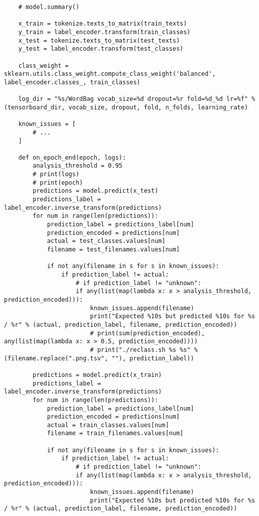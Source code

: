 \begin{verbatim}
    # model.summary()

    x_train = tokenize.texts_to_matrix(train_texts)
    y_train = label_encoder.transform(train_classes)
    x_test = tokenize.texts_to_matrix(test_texts)
    y_test = label_encoder.transform(test_classes)

    class_weight = sklearn.utils.class_weight.compute_class_weight('balanced', label_encoder.classes_, train_classes)

    log_dir = "%s/WordBag vocab_size=%d dropout=%r fold=%d_%d lr=%f" % (tensorboard_dir, vocab_size, dropout, fold, n_folds, learning_rate)

    known_issues = [
        # ...
    ]

    def on_epoch_end(epoch, logs):
        analysis_threshold = 0.95
        # print(logs)
        # print(epoch)
        predictions = model.predict(x_test)
        predictions_label = label_encoder.inverse_transform(predictions)
        for num in range(len(predictions)):
            prediction_label = predictions_label[num]
            prediction_encoded = predictions[num]
            actual = test_classes.values[num]
            filename = test_filenames.values[num]

            if not any(filename in s for s in known_issues):
                if prediction_label != actual:
                    # if prediction_label != "unknown":
                    if any(list(map(lambda x: x > analysis_threshold, prediction_encoded))):
                        known_issues.append(filename)
                        print("Expected %10s but predicted %10s for %s / %r" % (actual, prediction_label, filename, prediction_encoded))
                        # print(sum(prediction_encoded), any(list(map(lambda x: x > 0.5, prediction_encoded))))
                        # print("./reclass.sh %s %s" % (filename.replace(".png.tsv", ""), prediction_label))

        predictions = model.predict(x_train)
        predictions_label = label_encoder.inverse_transform(predictions)
        for num in range(len(predictions)):
            prediction_label = predictions_label[num]
            prediction_encoded = predictions[num]
            actual = train_classes.values[num]
            filename = train_filenames.values[num]

            if not any(filename in s for s in known_issues):
                if prediction_label != actual:
                    # if prediction_label != "unknown":
                    if any(list(map(lambda x: x > analysis_threshold, prediction_encoded))):
                        known_issues.append(filename)
                        print("Expected %10s but predicted %10s for %s / %r" % (actual, prediction_label, filename, prediction_encoded))


\end{verbatim}
